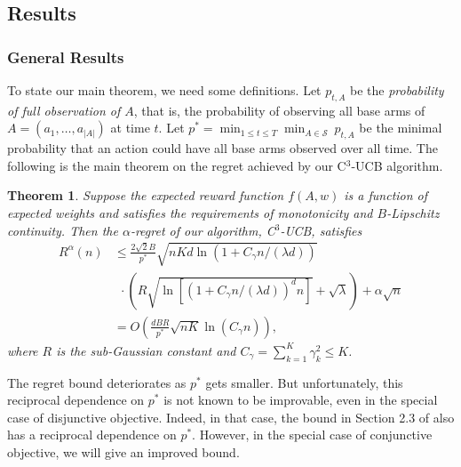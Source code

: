 \documentclass{article}
\newcommand{\cS}{\mathcal{S}}
\newcommand{\abs}[1]{\left| #1 \right|}
\newtheorem{theorem}{Theorem}[section]
\begin{document}
\subsection{Results}

\subsubsection{General Results}

To state our main theorem, we need some definitions. Let $p_{t, A}$ be the {\em probability of full observation of $A$}, that is, the probability of observing all base arms of $A = (a_1, \ldots, a_{\abs{A}})$ at time $t$. Let $p^* = \min_{1 \leq t \leq T} \min_{A \in \cS} ~ p_{t, A}$ be the minimal probability that an action could have all base arms observed over all time. The following is the main theorem on the regret achieved by our C$^3$-UCB algorithm.

\begin{theorem} %
	\label{thm:main}
	Suppose the expected reward function $f(A, w)$ is a function of expected weights and satisfies the requirements of monotonicity and $B$-Lipschitz continuity. Then the $\alpha$-regret of our algorithm, C$^3$-UCB, satisfies
	\begin{align}
		R^{\alpha}(n) &\le \frac{2\sqrt{2}B}{p^*} \sqrt{nKd\ln(1 + C_\gamma n/(\lambda d))}  \nonumber \\
		&~~ \cdot \left(R\sqrt{\ln \left[(1 + C_\gamma n/(\lambda d))^d n \right] } + \sqrt{\lambda}\right) + \alpha \sqrt{n}\nonumber \\
		&=O\left(\frac{dBR}{p^*} \sqrt{nK} \ln(C_\gamma n) \right),
	\end{align}
	where $R$ is the sub-Gaussian constant and $C_{\gamma} = \sum_{k=1}^K \gamma_k^2 \leq K$.
\end{theorem}
The regret bound deteriorates as $p^*$ gets smaller. But unfortunately, this reciprocal dependence on $p^*$ is not known to be improvable, even in the special case of disjunctive objective. Indeed, in that case, the bound in Section 2.3 of \cite{kveton2015combinatorial} also has a reciprocal dependence on $p^*$. However, in the special case of conjunctive objective, we will give an improved bound.
\end{document}
